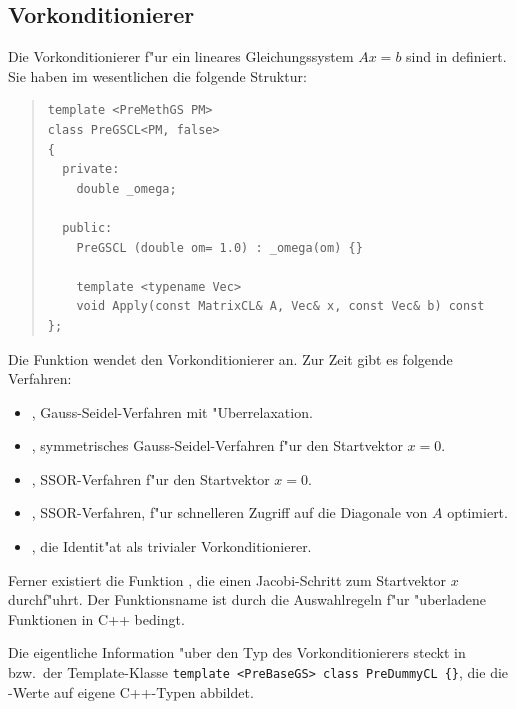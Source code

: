 \documentclass[11pt,a4paper]{article}
\newenvironment{Code}{\begin{quote}\scriptsize}{\end{quote}}
\begin{document}
\subsection{Vorkonditionierer}
\label{ss:vorkonditionierer}
Die Vorkonditionierer f"ur ein lineares Gleichungssystem $Ax=b$ sind
in  definiert. Sie haben im wesentlichen die folgende
Struktur:
\begin{Code}
\begin{verbatim}
template <PreMethGS PM>
class PreGSCL<PM, false>
{
  private:
    double _omega;

  public:
    PreGSCL (double om= 1.0) : _omega(om) {}

    template <typename Vec>
    void Apply(const MatrixCL& A, Vec& x, const Vec& b) const
};
\end{verbatim}
\end{Code}
Die Funktion  wendet den Vorkonditionierer an. Zur Zeit gibt
es folgende Verfahren:
\begin{itemize}
\item {}, Gauss-Seidel-Verfahren mit "Uberrelaxation.
\item {}, symmetrisches Gauss-Seidel-Verfahren f"ur den Startvektor $x=0$. 
\item {}, SSOR-Verfahren f"ur den Startvektor $x=0$.
\item {}, SSOR-Verfahren, f"ur schnelleren Zugriff auf die Diagonale von $A$ optimiert.
\item {}, die Identit"at als trivialer Vorkonditionierer.
\end{itemize}
Ferner existiert die Funktion , die einen Jacobi-Schritt zum Startvektor $x$ durchf"uhrt. Der
Funktionsname ist durch die Auswahlregeln f"ur "uberladene Funktionen
in C++ bedingt.

Die eigentliche Information "uber den Typ des Vorkonditionierers steckt in
 bzw.\ der Template-Klasse 
\verb|template <PreBaseGS> class PreDummyCL {}|, die die -Werte 
auf eigene C++-Typen abbildet.
\end{document}
